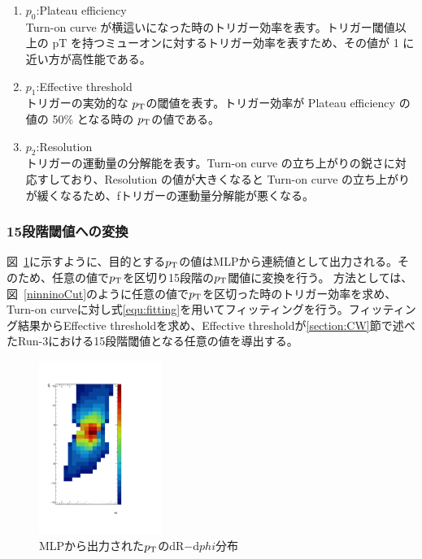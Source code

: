 \begin{enumerate}\label{table:fitting}
   \item $p_0$:Plateau efficiency\\
   Turn-on curve が横這いになった時のトリガー効率を表す。トリガー閾値以上の pT を持つミューオンに対するトリガー効率を表すため、その値が 1 に近い方が高性能である。
   \item $p_1$:Effective threshold\\
   トリガーの実効的な $p_{\rm{T}}$の閾値を表す。トリガー効率が Plateau efficiency の値の 50\% となる時の $p_{\rm{T}}$の値である。
   \item $p_2$:Resolution\\
   トリガーの運動量の分解能を表す。Turn-on curve の立ち上がりの鋭さに対応すしており、Resolution の値が大きくなると Turn-on curve の立ち上がりが緩くなるため、fトリガーの運動量分解能が悪くなる。
\end{enumerate}

\newpage
\subsubsection{15段階閾値への変換}
図~\ref{fig:all_output}に示すように、目的とする$p_{\rm{T}}$の値はMLPから連続値として出力される。そのため、任意の値で$p_{\rm{T}}$を区切り15段階の$p_{\rm{T}}$閾値に変換を行う。
方法としては、図~\ref{ninninoCut}のように任意の値で$p_{\rm{T}}$を区切った時のトリガー効率を求め、Turn-on curveに対し式\eqref{equ:fitting}を用いてフィッティングを行う。フィッティング結果からEffective thresholdを求め、Effective thresholdが\ref{section:CW}節で述べたRun-3における15段階閾値となる任意の値を導出する。
\begin{figure}[tb]
  \centering
  \includegraphics[clip, width=4cm]{fig/4/all_output_rainbow.pdf}
  \caption{MLPから出力された$p_{\rm{T}}$のdR$-$d$phi$分布}
  \label{fig:all_output}
\end{figure}

